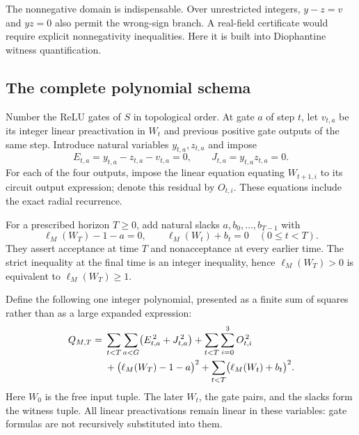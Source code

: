\documentclass[11pt,letterpaper]{article}
\numberwithin{equation}{section}
\theoremstyle{definition}
\theoremstyle{remark}
\begin{document}
The nonnegative domain is indispensable. Over unrestricted integers,
$y-z=v$ and $yz=0$ also permit the wrong-sign branch. A real-field certificate
would require explicit nonnegativity inequalities. Here it is built into
Diophantine witness quantification.

\subsection{The complete polynomial schema}

Number the ReLU gates of $S$ in topological order. At gate $a$ of step $t$,
let $v_{t,a}$ be its integer linear preactivation in $W_t$ and previous
positive gate outputs of the same step. Introduce natural variables
$y_{t,a},z_{t,a}$ and impose
\[
 E_{t,a}=y_{t,a}-z_{t,a}-v_{t,a}=0,
 \qquad J_{t,a}=y_{t,a}z_{t,a}=0.
\]
For each of the four outputs, impose the linear equation equating
$W_{t+1,i}$ to its circuit output expression; denote this residual by
$O_{t,i}$. These equations include the exact radial recurrence.

For a prescribed horizon $T\ge0$, add natural slacks $a,b_0,\ldots,b_{T-1}$
with
\begin{equation}\label{pqc:sc:eq:firsthit-slacks}
 \ell_M(W_T)-1-a=0,\qquad
 \ell_M(W_t)+b_t=0\quad(0\le t<T).
\end{equation}
They assert acceptance at time $T$ and nonacceptance at every earlier time.
The strict inequality at the final time is an integer inequality, hence
$\ell_M(W_T)>0$ is equivalent to $\ell_M(W_T)\ge1$.

Define the following one integer polynomial, presented as a finite sum of
squares rather than as a large expanded expression:
\begin{align}
 Q_{M,T}={}&\sum_{t<T}\sum_{a<G}
       \bigl(E_{t,a}^{\,2}+J_{t,a}^{\,2}\bigr)
       +\sum_{t<T}\sum_{i=0}^3 O_{t,i}^{\,2} \notag\\
 &+\bigl(\ell_M(W_T)-1-a\bigr)^2
       +\sum_{t<T}\bigl(\ell_M(W_t)+b_t\bigr)^2.
 \label{pqc:sc:eq:quartic}
\end{align}
Here $W_0$ is the free input tuple. The later $W_t$, the gate pairs, and the
slacks form the witness tuple. All linear preactivations remain linear in
these variables: gate formulas are not recursively substituted into them.
\end{document}
